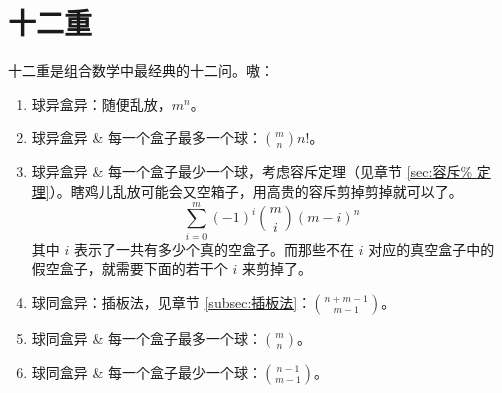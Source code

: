 \section{十二重}
十二重是组合数学中最经典的十二问。嗷：
\begin{enumerate}
    \item 球异盒异：随便乱放，$m^n$。
    \item 球异盒异 \& 每一个盒子最多一个球：${m \choose n} n!$。
    \item 球异盒异 \& 每一个盒子最少一个球，考虑容斥定理（见章节 \ref{sec:容斥%
        定理}）。瞎鸡儿乱放可能会又空箱子，用高贵的容斥剪掉剪掉就可以了。\[
            \sum^m_{i=0} (-1)^i {m \choose i} (m - i)^n
        \]
        其中 $i$ 表示了一共有多少个真的空盒子。而那些不在 $i$ 对应的真空盒子中的
        假空盒子，就需要下面的若干个 $i$ 来剪掉了。

    \item 球同盒异：插板法，见章节 \ref{subsec:插板法}：$n + m - 1 \choose m -
        1$。
    \item 球同盒异 \& 每一个盒子最多一个球：$m \choose n$。
    \item 球同盒异 \& 每一个盒子最少一个球：$n - 1 \choose m - 1$。
\end{enumerate}
